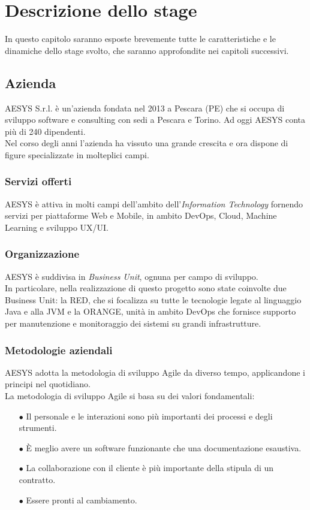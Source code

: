 \chapter{Descrizione dello stage}\label{chapter:descrizione}
In questo capitolo saranno esposte brevemente tutte le caratteristiche e le dinamiche dello stage svolto, che saranno approfondite nei capitoli successivi.

\section{Azienda}\label{sec:azienda}
AESYS S.r.l. è un’azienda fondata nel 2013 a Pescara (PE) che si occupa di sviluppo software e consulting con sedi a Pescara e Torino. Ad oggi AESYS conta più di 240 dipendenti.\\
Nel corso degli anni l’azienda ha vissuto una grande crescita e ora dispone di figure specializzate in molteplici campi.\\

\subsection{Servizi offerti}
AESYS è attiva in molti campi dell’ambito dell’\emph{Information Technology} fornendo servizi per piattaforme Web e Mobile, in ambito DevOps, Cloud, Machine Learning e sviluppo UX/UI.

\subsection{Organizzazione}
AESYS è suddivisa in \emph{Business Unit}, ognuna per campo di sviluppo.\\
In particolare, nella realizzazione di questo progetto sono state coinvolte due Business Unit: la RED, che si focalizza su tutte le tecnologie legate al linguaggio Java e alla JVM e la ORANGE, unità in ambito DevOps che fornisce supporto per manutenzione e monitoraggio dei sistemi su grandi infrastrutture.

\subsection{Metodologie aziendali}
AESYS adotta la metodologia di sviluppo Agile da diverso tempo, applicandone i principi nel quotidiano.\\
La metodologia di sviluppo Agile si basa su dei valori fondamentali:
\begin{itemize}
	\item[$\bullet$]Il personale e le interazioni sono più importanti dei processi e degli strumenti.
	\item[$\bullet$]È meglio avere un software funzionante che una documentazione esaustiva.
	\item[$\bullet$]La collaborazione con il cliente è più importante della stipula di un contratto.
	\item[$\bullet$]Essere pronti al cambiamento.
\end{itemize}

